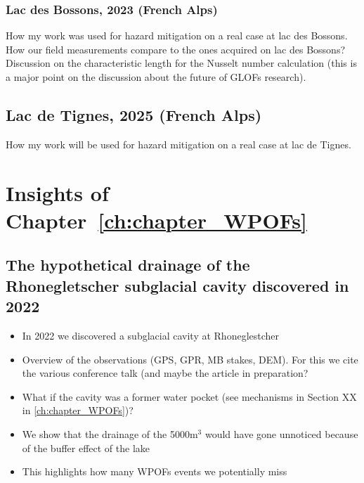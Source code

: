 \subsubsection{Lac des Bossons, 2023 (French Alps)}

How my work was used for hazard mitigation on a real case at lac des Bossons. How our field measurements compare to the ones acquired on lac des Bossons? Discussion on the characteristic length for the Nusselt number calculation (this is a major point on the discussion about the future of GLOFs research). 

\subsection{Lac de Tignes, 2025 (French Alps)}

How my work will be used for hazard mitigation on a real case at lac de Tignes.

\section{Insights of Chapter~\ref{ch:chapter_WPOFs}}

\subsection{ The hypothetical drainage of the Rhonegletscher subglacial cavity discovered in 2022}

\begin{itemize}
    \item In 2022 we discovered a subglacial cavity at Rhoneglestcher
    \item Overview of the observations (GPS, GPR, MB stakes, DEM). For this we cite the various conference talk (and maybe the article in preparation?
    \item What if the cavity was a former water pocket (see mechanisms in Section XX in \ref{ch:chapter_WPOFs})? 
    \item We show that the drainage of the 5000m$^3$ would have gone unnoticed because of the buffer effect of the lake
    \item This highlights how many WPOFs events we potentially miss
\end{itemize}


